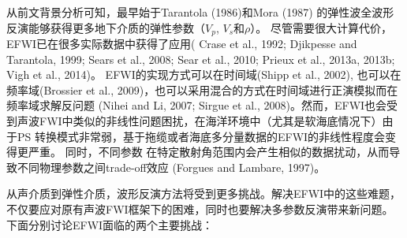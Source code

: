 从前文背景分析可知，最早始于Tarantola (1986)\cite{tarantola:1986}和Mora (1987)\cite{mora:1987}
的弹性波全波形反演能够获得更多地下介质的弹性参数（$V_p$, $V_s$和$\rho$）。
尽管需要很大计算代价，EFWI已在很多实际数据中获得了应用(
Crase et al., 1992\cite{crase1992nonlinear}; Djikpesse and Tarantola,
1999\cite{djikpesse.tarantola:1999}; Sears et al., 2008\cite{sears2008}; Sear et al.,
2010\cite{sears:2010}; Prieux et al., 2013a\cite{prieux:2013a}, 2013b\cite{prieux:2013b}; Vigh et al.,
2014\cite{vigh:2014})。
EFWI的实现方式可以在时间域(Shipp et al., 2002\cite{shipp:2002}),
也可以在频率域(Brossier et al.,
2009\cite{brossier2009})，也可以采用混合的方式在时间域进行正演模拟而在频率域求解反问题
(Nihei and Li, 2007\cite{nihei.li:2007}; Sirgue et al.,
2008\cite{sirgue:2008})。然而，EFWI也会受到声波FWI中类似的非线性问题困扰，在海洋环境中（尤其是软海底情况下）由于PS
转换模式非常弱，基于拖缆或者海底多分量数据的EFWI的非线性程度会变得更严重\cite{sears2008}。
同时，不同参数
在特定散射角范围内会产生相似的数据扰动，从而导致不同物理参数之间trade-off效应
(Forgues and Lambare, 1997\cite{forgues.lambare:1997})。

从声介质到弹性介质，波形反演方法将受到更多挑战。解决EFWI中的这些难题，
不仅要应对原有声波FWI框架下的困难，同时也要解决多参数反演带来新问题。下面分别讨论EFWI面临的两个主要挑战：

